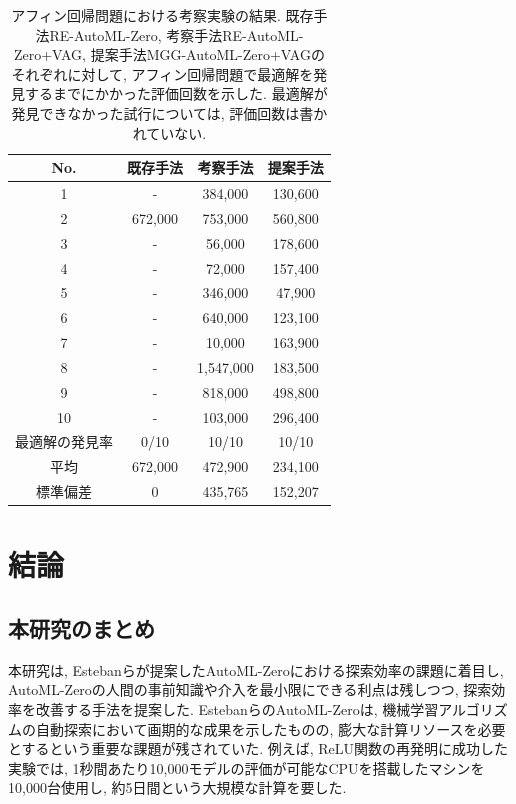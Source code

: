 \documentclass[11pt,oneside,openany,report]{jsbook}
\begin{document}
\begin{table}[tbp]
  \caption{アフィン回帰問題における考察実験の結果. 既存手法RE-AutoML-Zero, 考察手法RE-AutoML-Zero+VAG, 提案手法MGG-AutoML-Zero+VAGのそれぞれに対して, アフィン回帰問題で最適解を発見するまでにかかった評価回数を示した. 最適解が発見できなかった試行については, 評価回数は書かれていない.}
  \label{table:exp:result:aggregation:affine_regression}
  \centering
  \begin{tabular}{|c|c|c|c|}
    \hline
    No. & 既存手法 & 考察手法 & 提案手法  \\
    \hline \hline
    1       & - & 384,000   & 130,600 \\
    2       & 672,000 & 753,000   & 560,800 \\
    3       & - & 56,000    & 178,600 \\
    4       & - & 72,000    & 157,400 \\
    5       & - & 346,000   &  47,900 \\
    6       & - & 640,000   & 123,100 \\
    7       & - & 10,000    & 163,900 \\
    8       & - & 1,547,000 & 183,500 \\
    9       & - & 818,000   & 498,800 \\
    10      & - & 103,000   & 296,400 \\
    \hline
    最適解の発見率 & 0/10 & 10/10 & 10/10 \\
    平均 &  672,000 & 472,900 & 234,100 \\
    標準偏差& 0 & 435,765 & 152,207 \\
    \hline
  \end{tabular}
\end{table}

\chapter{結論} \label{chap:conclusion}

\section{本研究のまとめ}

本研究は, Estebanらが提案したAutoML-Zeroにおける探索効率の課題に着目し, AutoML-Zeroの人間の事前知識や介入を最小限にできる利点は残しつつ, 探索効率を改善する手法を提案した. EstebanらのAutoML-Zeroは, 機械学習アルゴリズムの自動探索において画期的な成果を示したものの, 膨大な計算リソースを必要とするという重要な課題が残されていた. 例えば, ReLU関数の再発明に成功した実験では, 1秒間あたり10,000モデルの評価が可能なCPUを搭載したマシンを10,000台使用し, 約5日間という大規模な計算を要した.
\end{document}
